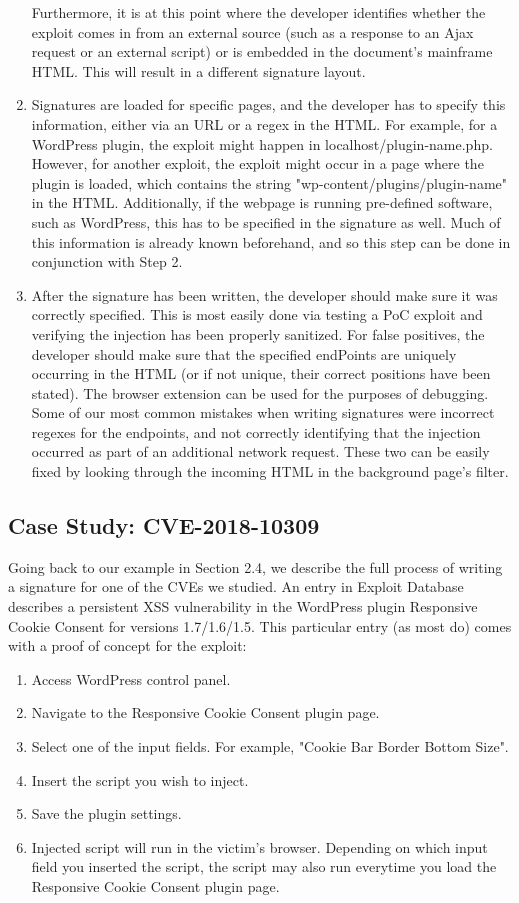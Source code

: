 \begin{enumerate}
Furthermore, it is at this point where the developer identifies whether the exploit comes in from an external source (such as a response to an Ajax request or an external script) or is embedded in the document's mainframe HTML. This will result in a different signature layout. 
\item
Signatures are loaded for specific pages, and the developer has to specify this information, either via an URL or a regex in the HTML. For example, for a WordPress plugin, the exploit might happen in localhost/plugin-name.php. However, for another exploit, the exploit might occur in a page where the plugin is loaded, which contains the string "wp-content/plugins/plugin-name" in the HTML. Additionally, if the webpage is running pre-defined software, such as WordPress, this has to be specified in the signature as well. Much of this information is already known beforehand, and so this step can be done in conjunction with Step 2.
\item
After the signature has been written, the developer should make sure it was correctly specified. This is most easily done via testing a PoC exploit and verifying the injection has been properly sanitized. For false positives, the developer should make sure that the specified endPoints are uniquely occurring in the HTML (or if not unique, their correct positions have been stated). The browser extension can be used for the purposes of debugging. Some of our most common mistakes when writing signatures were incorrect regexes for the endpoints, and not correctly identifying that the injection occurred as part of an additional network request. These two can be easily fixed by looking through the incoming HTML in the background page's filter. 
\end{enumerate}

\subsection{Case Study: CVE-2018-10309}
Going back to our example in Section 2.4, we describe the full process of writing a signature for one of the CVEs we studied. An entry in Exploit Database \cite{studyCVE} describes a persistent \ac{XSS} vulnerability in the WordPress plugin Responsive Cookie Consent for versions 1.7/1.6/1.5. This particular entry (as most do) comes with a proof of concept for the exploit: 
\begin{enumerate}
\item Access WordPress control panel.
\item Navigate to the Responsive Cookie Consent plugin page.
\item Select one of the input fields. For example, "Cookie Bar Border Bottom Size".
\item Insert the script you wish to inject.
\item Save the plugin settings.
\item Injected script will run in the victim's browser. Depending on which input field you inserted the script, the script may also run everytime you load the Responsive Cookie Consent plugin page.
	
\end{enumerate}

